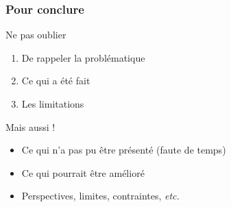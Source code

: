 
\begin{frame}
\frametitle{Pour conclure}

\begin{block}{Ne pas oublier}
\begin{enumerate}
\item De rappeler la problématique
\item Ce qui a été fait
\item Les limitations
\end{enumerate}
\end{block}

\begin{block}{Mais aussi !}
\begin{itemize}
\item Ce qui n'a pas pu être présenté (faute de temps)
\item Ce qui pourrait être amélioré
\item Perspectives, limites, contraintes, {\it etc.}
\end{itemize}
\end{block}

\end{frame}



